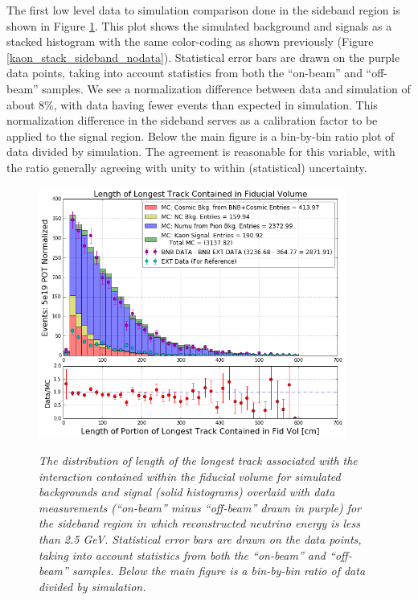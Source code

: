 The first low level data to simulation comparison done in the sideband region is shown in Figure \ref{kaon_sideband_comp_tracklength}. This plot shows the simulated background and signals as a stacked histogram with the same color-coding as shown previously (Figure \ref{kaon_stack_sideband_nodata}). Statistical error bars are drawn on the purple data points, taking into account statistics from both the ``on-beam'' and ``off-beam'' samples. We see a normalization difference between data and simulation of about 8\%, with data having fewer events than expected in simulation. This normalization difference in the sideband serves as a calibration factor to be applied to the signal region. Below the main figure is a bin-by-bin ratio plot of data divided by simulation. The agreement is reasonable for this variable, with the ratio generally agreeing with unity to within (statistical) uncertainty.\\


\begin{figure}[ht!]
\centering
	\includegraphics[width=0.9\textwidth]{Figures/kaon_sideband_comp_tracklength.png} \\
\caption{\textit{The distribution of length of the longest track associated with the interaction contained within the fiducial volume for simulated backgrounds and signal (solid histograms) overlaid with data measurements (``on-beam'' minus ``off-beam'' drawn in purple) for the sideband region in which reconstructed neutrino energy is less than 2.5 GeV. Statistical error bars are drawn on the data points, taking into account statistics from both the ``on-beam'' and ``off-beam'' samples. Below the main figure is a bin-by-bin ratio of data divided by simulation.}}\label{kaon_sideband_comp_tracklength}
\end{figure}

